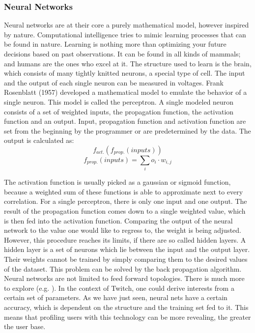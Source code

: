 \subsubsection{Neural Networks}
Neural networks are at their core a purely mathematical model, however 
inspired by nature. Computational intelligence tries to mimic learning 
processes that can be found in nature. Learning is nothing more than optimizing your future decisions
based on past observations. It can be found in all kinds of mammals; and humans are the ones who excel at it. 
The structure used to learn is the brain, which consists of many
tightly knitted neurons, a special type of cell. The input and the output of each single neuron 
can be measured in voltages. 
Frank Rosenblatt (1957) developed a mathematical model to emulate the behavior of 
a single neuron. This model is called the perceptron. A single modeled
neuron consists of a set of weighted inputs, the propagation function, the activation function
and an output. Input, propagation function and activation function are set from
the beginning by the programmer or are predetermined by the data. The output
is calculated as: 
\[ f_{act.}(f_{prop.}(inputs)) \]
\[ f_{prop.}(inputs) = \sum_{i} o_{i} \cdot w_{i,j} \]

The activation function is usually picked as a gaussian or sigmoid function,
because a weighted sum of these functions is able to approximate next to every correlation.
For a single perceptron, there is only one input and one output. The result of the
propagation function comes down to a single weighted value, which is then fed
into the activation function. Comparing the output of the neural network to the 
value one would like to regress to, the weight is being adjusted. However,
this procedure reaches its limits, if there are so called hidden layers. A hidden layer
is a set of neurons which lie between the input and the output layer. Their weights
cannot be trained by simply comparing them to the desired values of the
dataset. This problem can be solved by the back propagation algorithm. Neural networks
are not limited to feed forward topologies. There is much more to explore (e.g. \cite{computational-intelligence}). 
In the context of Twitch, one could derive interests from a certain set of 
parameters. As we have just seen, neural nets have a certain accuracy, which 
is dependent on the structure and the training set fed to it. This means
that profiling users with this technology can be more revealing, the greater
the user base. 
